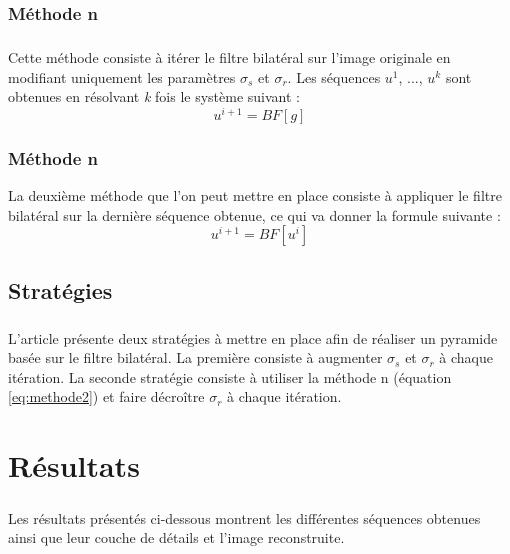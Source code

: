 \documentclass[twoside,UTF8]{EPURapport}
\begin{document}
\subsection{Méthode n}	

\paragraph{}
Cette méthode consiste à itérer le filtre bilatéral sur l'image originale en modifiant uniquement les paramètres $\sigma_s$ et $\sigma_r$. Les séquences \textit{$u^1$}, ..., \textit{$u^k$} sont obtenues en résolvant \textit{k} fois le système suivant : 
\begin{equation}
\label{eq:methode1}
	u^{i+1} = BF[g]
\end{equation}

\subsection{Méthode n}		

La deuxième méthode que l'on peut mettre en place consiste à appliquer le filtre bilatéral sur la dernière séquence obtenue, ce qui va donner la formule suivante : 
\begin{equation}
\label{eq:methode2}
	u^{i+1} = BF[u^i]
\end{equation}


	\section{Stratégies}		

\paragraph{}
L'article \cite{decompo} présente deux stratégies à mettre en place afin de réaliser un pyramide basée sur le filtre bilatéral. La première consiste à augmenter $\sigma_s$ et $\sigma_r$ à chaque itération. La seconde stratégie consiste à utiliser la méthode n (équation \ref{eq:methode2}) et faire décroître $\sigma_r$ à chaque itération.

\chapter{Résultats}

\paragraph{}
Les résultats présentés ci-dessous montrent les différentes séquences obtenues ainsi que leur couche de détails et l'image reconstruite. 
\end{document}
